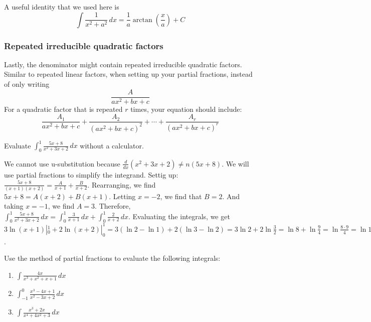 A useful identity that we used here is 
$$\int \frac{1}{x^2 + a^2}\,dx = \frac{1}{a} \arctan{\left( \frac{x}{a} \right)} 
+ C$$

\subsubsection{Repeated irreducible quadratic factors}
Lastly, the denominator might contain repeated irreducible quadratic factors. 
Similar to repeated linear factors, when setting up your partial fractions, 
instead of only writing 
$$\frac{A}{ax^2 + bx + c}$$
For a quadratic factor that is repeated $r$ times, your equation should include:
$$\frac{A_1}{ax^2 + bx + c} + \frac{A_2}{(ax^2 + bx + c)^2} + \cdots + 
\frac{A_r}{(ax^2 + bx + c)^r}$$

\begin{Exercise}[label = int_meth2]
	Evaluate $\int_0^1 \frac{5x + 8}{x^2 + 3x + 2}\,dx$ without a 
	calculator. 
	\vspace{30mm}
\end{Exercise}

\begin{Answer}[ref=int_meth2]
	We cannot use u-substitution because $\frac{d}{dx}(x^2 + 3x + 2) \neq 
	n(5x + 8)$. We will use partial fractions to simplify the integrand. 
	Settig up: $\frac{5x + 8}{(x + 1)(x + 2)} = \frac{A}{x + 1} + 
	\frac{B}{x + 2}$. Rearranging, we find $5x + 8 = A(x + 2) + B(x + 1)$. 
	Letting $x = -2$, we find that $B = 2$. And taking $x = -1$, we find 
	$A = 3$. Therefore, $\int_0^1 \frac{5x + 8}{x^2 + 3x + 2}\,dx = \int
	_0^1 \frac{3}{x + 1}\,dx + \int_0^1 \frac{2}{x + 2}\,dx$. Evaluating 
	the integrals, we get $3\ln{(x + 1)}|_0^1 + 2\ln{(x + 2)}|_0^1 = 3(
	\ln{2} - \ln{1}) + 2(\ln{3} - \ln{2}) = 3\ln{2} + 2\ln{\frac{3}{2}} 
	= \ln{8} + \ln{\frac{9}{4}} = \ln{\frac{8 \cdot 9}{4}} = \ln{18}$. 
\end{Answer}

\begin{Exercise}[label = partfrac]
Use the method of partial fractions to evaluate the following integrals:
\begin{enumerate}
\item $\int \frac{4x}{x^3 + x^2 + x + 1}\,dx$
\item $\int_{-1}^0 \frac{x^3 - 4x + 1}{x^2 - 3x + 2}\,dx$
\item $\int \frac{x^3 + 2x}{x^4 + 4x^2 + 3}\,dx$
\end{enumerate}
\vspace{50mm}
\end{Exercise}

